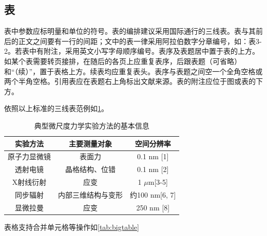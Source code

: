 \subsection{表}


表中参数应标明量和单位的符号。表的编排建议采用国际通行的三线表。表与其前后的正文之间要有一行的间距；文中的表一律采用阿拉伯数字分章编号，如：表3-2。若表中有附注，采用英文小写字母顺序编号。表序及表题居中置于表的上方。如某个表需要转页接排，在随后的各页上应重复表序，后跟表题（可省略）和“（续）”，置于表格上方。续表均应重复表头。表序与表题之间空一个全角空格或两个半角空格。引用表应在表题右上角标出文献来源。表的附注应位于图或表的下方。

依照以上标准的三线表范例如\ref{tab:tab1}。

\begin{table}[!htbp]
  \centering
  \caption{典型微尺度力学实验方法的基本信息}
  \label{tab:tab1}
  \vspace{0.5em}
  \begin{tabular}{ccc}
    \toprule
    \textbf{实验方法} & \textbf{主要测量对象} & \textbf{空间分辨率}    \\
    \midrule
    原子力显微镜        & 表面力             & 0.1 nm {[}1{]}    \\
    透射电镜          & 晶格结构、位错         & 0.1 nm {[}2{]}    \\
    X射线衍射         & 应变              & 1 $\mu$m{[}3-5{]}     \\
    同步辐射          & 内部三维结构与变形       & 约100 nm{[}6, 7{]} \\
    显微拉曼          & 应变              & 250 nm {[}8{]}    \\ 
    \bottomrule
  \end{tabular}
\end{table}

表格支持合并单元格等操作如\ref{tab:bigtable}


